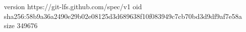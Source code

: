 version https://git-lfs.github.com/spec/v1
oid sha256:58b9a36a2490e29b02e08125d3d689638f10f083949c7cb70bd3d9df9af7e58a
size 349676
